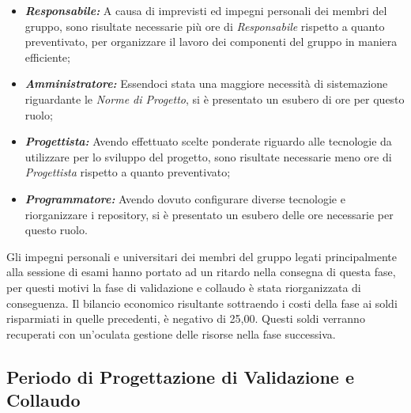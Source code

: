 \begin{itemize}
    \item \textbf{\textit{Responsabile:}} A causa di imprevisti ed impegni personali dei membri del gruppo, sono risultate necessarie più ore di \textit{Responsabile} rispetto a quanto preventivato, per organizzare il lavoro dei componenti del gruppo in maniera efficiente;
    \item \textbf{\textit{Amministratore:}} Essendoci stata una maggiore necessità di sistemazione riguardante le \textit{Norme di Progetto}, si è presentato un esubero di ore per questo ruolo;
    \item \textbf{\textit{Progettista:}} Avendo effettuato scelte ponderate riguardo alle tecnologie da utilizzare per lo sviluppo del progetto, sono risultate necessarie meno ore di \textit{Progettista} rispetto a quanto preventivato;
    \item \textbf{\textit{Programmatore:}} Avendo dovuto configurare diverse tecnologie e riorganizzare i repository, si è presentato un esubero delle ore necessarie per questo ruolo.
\end{itemize}
Gli impegni personali e universitari dei membri del gruppo legati principalmente alla sessione di esami hanno portato ad un ritardo nella consegna di questa fase, per questi motivi la fase di validazione e collaudo è stata riorganizzata di conseguenza.
Il bilancio economico risultante sottraendo i costi della fase ai soldi risparmiati in quelle precedenti, è negativo di 25,00\EURdig. Questi soldi verranno recuperati con un'oculata gestione delle risorse nella fase successiva.
\pagebreak

\subsection{Periodo di Progettazione di Validazione e Collaudo}
